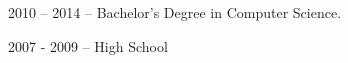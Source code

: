 

\begin{content}
	2010 – 2014 – Bachelor's Degree in Computer Science.
\end{content}


\begin{content}
	2007 - 2009 – High School
\end{content}
